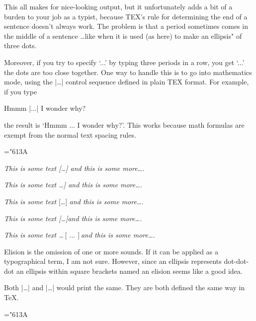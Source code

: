 This all makes for nice-looking output, but it unfortunately adds a bit
of a burden to your job as a typist, because TEX's rule for determining the end of
a sentence doesn't always work. The problem is that a period sometimes comes
in the middle of a sentence \dots like when it is used (as here) to make an ellipsis"
of three dots.

Moreover, if you try to specify `...' by typing three periods in a row,
you get `...' the dots are too close together. One way to handle this is to go
into mathematics mode, using the |\ldots| control sequence defined in plain TEX
format. For example, if you type

Hmmm |$\ldots$| I wonder why?

the result is `Hmmm $\ldots$ I wonder why?'. This works because math formulas are
exempt from the normal text spacing rules.


\begin{teXXX}
\mathchardef\ldotp="613A %
\def\ldots{\mathinner{\ldotp\ldotp\ldotp}}
\end{teXXX}

\def\elide{\textup{[\phantom{,}\dots]\xspace}}


\emph{This is some text {[\thinspace\ldots\thinspace]} and this is some more\dots .}

\emph{This is some text {\smaller{[}\ldots]} and this is some more\dots .}

\emph{This is some text} {[\ldots]} \emph{and this is some more\dots .}

\emph{This is some text \elide and this is some more\dots .}


\def\elide{\relax\ifmmode\ldots\else $[\,\ldots\,]$\fi}

\emph{This is some text \elide and this is some more\dots .}

Elision is the omission of one or more sounds. If it can be applied as a typographical term, I am not sure. However, since an ellipsis represents dot-dot-dot an ellipsis within square brackets named an elision seems like a good idea.

Both |\dots| and |\ldots| would print the same. They are both defined the same way in \TeX .

\begin{teX}
 \mathchardef\ldotp="613A %
 \def\ldots{\mathinner{\ldotp\ldotp\ldotp}}
 \def\dots{\relax\ifmmode\ldots\else$\m@th\ldots\,$\fi}
\end{teX}

